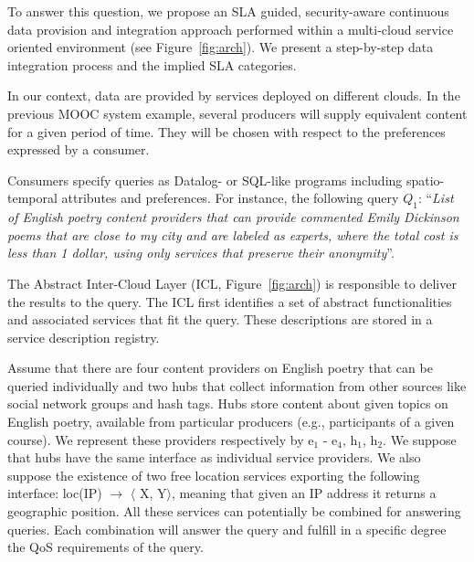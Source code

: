 To answer this question, we propose an SLA guided, security-aware continuous data provision and integration approach performed within a multi-cloud service oriented environment  (see
Figure~\ref{fig:arch}). 
We present a step-by-step data integration process and the implied  SLA categories.

In our context, data are provided by services deployed on different clouds. 
In the previous   MOOC system example, several producers will supply equivalent content for a given period of time. 
They will be chosen with respect to the  preferences expressed by a consumer. 

Consumers  specify queries as Datalog- or SQL-like programs including spatio-temporal attributes and preferences.
For instance, the following query $Q_1$: ``\textit{List of English poetry content providers that can provide commented Emily Dickinson poems that are close to my city and are labeled as experts, where the total cost is less than 1 dollar, using only services that preserve their anonymity}''. 

The Abstract Inter-Cloud Layer (ICL, Figure~\ref{fig:arch}) is responsible to deliver the results to the  query. 
The ICL  first identifies a set of abstract functionalities  and associated services that fit the  query. These descriptions are stored in a service description registry.

Assume that there are four content providers on English poetry that can be queried individually and two hubs that collect information from other sources like social network groups and hash tags.
Hubs  store content about given topics on  English poetry, available from particular producers (e.g., participants of a given course).
We represent these providers respectively by { e$_1$ - e$_4$}, {h$_1$}, {h$_2$}. 
We suppose that hubs  have the same interface as individual service providers.
We also suppose the existence of two free location services exporting the following interface: {loc(IP) $\rightarrow$ $\langle$ X, Y$\rangle$}, meaning that given an IP address it returns a geographic position.
All these services can potentially be combined for answering queries. Each combination will answer the query and fulfill in a specific degree the QoS requirements of the query.




\begin{figure}
\end{figure}


